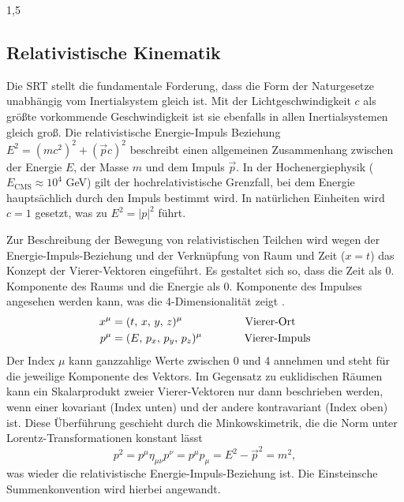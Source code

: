 \documentclass[11pt,a4paper,twoside]{report}
\begin{document}
\begin{spacing}{1,5}
\subsection{Relativistische Kinematik}
Die SRT stellt die fundamentale Forderung, dass die Form der Naturgesetze unabhängig vom Inertialsystem gleich ist. Mit der Lichtgeschwindigkeit $c$ als
größte vorkommende Geschwindigkeit ist sie ebenfalls in allen Inertialsystemen gleich groß. Die relativistische Energie-Impuls Beziehung 
$E^2 = \left(mc^2\right)^2 + \left(\vec pc\right)^2$ beschreibt einen allgemeinen Zusammenhang zwischen der Energie $E$, der Masse $m$ und dem Impuls $\vec p$.
In der Hochenergiephysik ($E_{\text{CMS}} \approx 10^4$ GeV) gilt der hochrelativistische Grenzfall, bei dem Energie hauptsächlich durch den Impuls bestimmt wird.
In natürlichen Einheiten wird $c = 1$ gesetzt, was zu $E^2 = \left|p\right|^2$ führt.

Zur Beschreibung der Bewegung von relativistischen Teilchen wird wegen der Energie-Impuls-Beziehung und der Verknüpfung von Raum und Zeit ($x = t$) das Konzept
der Vierer-Vektoren eingeführt. Es gestaltet sich so, dass die Zeit als 0. Komponente des Raums und die Energie als 0. Komponente des Impulses angesehen werden
kann, was die 4-Dimensionalität zeigt \cite{RelKin}.
\begin{align}
 x^\mu &= (t,\,x,\,y,\,z)^\mu \hspace{2cm} \text{Vierer-Ort}\\
 p^\mu &= (E,\,p_x,\,p_y,\,p_z)^\mu \hspace{1.35cm} \text{Vierer-Impuls}
\end{align}
Der Index $\mu$ kann ganzzahlige Werte zwischen 0 und 4 annehmen und steht für die jeweilige Komponente des Vektors. Im Gegensatz zu euklidischen Räumen 
kann ein Skalarprodukt zweier Vierer-Vektoren nur dann beschrieben werden, wenn einer kovariant (Index unten) und der andere kontravariant (Index oben) ist.
Diese Überführung geschieht durch die Minkowskimetrik, die die Norm unter Lorentz-Transformationen konstant lässt
\begin{equation}
  p^2 = p^\mu \eta_{\mu \nu} p^\nu = p^\mu p_\mu = E^2 - \vec p^2 = m^2,
\end{equation}
was wieder die relativistische Energie-Impuls-Beziehung ist. Die Einsteinsche Summenkonvention wird hierbei angewandt.

\end{spacing}
\end{document}
